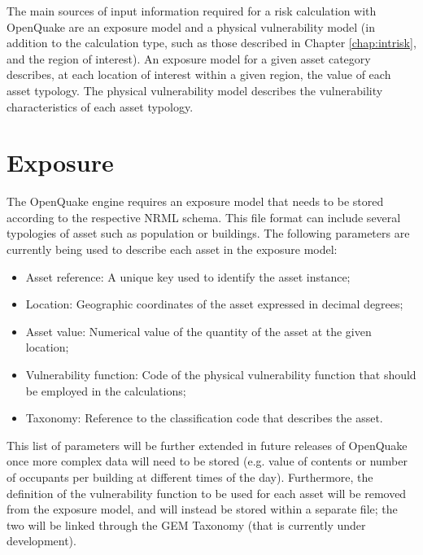 The main sources of input information required for a risk calculation with OpenQuake are an exposure model and a physical vulnerability model (in addition to the calculation type, such as those described in Chapter \ref{chap:intrisk}, and the region of interest). An exposure model for a given asset category describes, at each location of interest within a given region, the value of each asset typology. The physical vulnerability model describes the vulnerability characteristics of each asset typology.
\section{Exposure}
The OpenQuake engine requires an exposure model that needs to be stored according to the respective NRML schema. This file format can include several typologies of asset such as population or buildings. The following parameters are currently being used to describe each asset in the exposure model: 

\begin{itemize}
\item Asset reference: A unique key used to identify the asset instance;
\item Location: Geographic coordinates of the asset expressed in decimal degrees;
\item Asset value: Numerical value of the quantity of the asset at the given location;
\item Vulnerability function: Code of the physical vulnerability function that should be employed in the calculations;
\item Taxonomy: Reference to the classification code that describes the asset.
\end{itemize}

This list of parameters will be further extended in future releases of OpenQuake once more complex data will need to be stored (e.g. value of contents or number of occupants per building at different times of the day).  Furthermore, the definition of the vulnerability function to be used for each asset will be removed from the exposure model, and will instead be stored within a separate file; the two will be linked through the GEM Taxonomy (that is currently under development).

